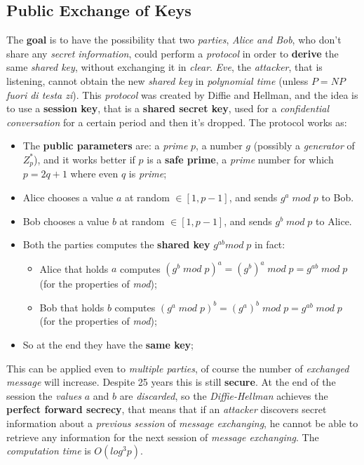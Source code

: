\documentclass{article}
\begin{document}
\subsection{Public Exchange of Keys}
The \textbf{goal} is to have the possibility that two \emph{parties}, \emph{Alice and Bob}, who don't share any \emph{secret information}, could perform a \emph{protocol} in order to \textbf{derive} the same \emph{shared key}, without exchanging it in \emph{clear}. \emph{Eve}, the \emph{attacker}, that is listening, cannot obtain the new \emph{shared key} in \emph{polynomial time} (unless $P=NP$ \emph{fuori di testa zi}). This \emph{protocol} was created by Diffie and Hellman, and the idea is to use a \textbf{session key}, that is a \textbf{shared secret key}, used for a \emph{confidential conversation} for a certain period and then it's dropped. The protocol works as:
\begin{itemize}
\item The \textbf{public parameters} are: a \emph{prime} $p$, a number $g$ (possibly a \emph{generator} of $Z_p^{*}$), and it works better if $p$ is a\textbf{ safe prime}, a \emph{prime} number for which $p=2q+1$ where even $q$ is \emph{prime};
\item Alice chooses a value $a$ at random $\in \left [1,p-1 \right]$, and sends $g^a\; mod\; p$ to Bob.
\item Bob chooses a value $b$ at random $\in \left [1,p-1 \right]$, and sends $g^b\; mod\; p$ to Alice.
\item Both the parties computes the \textbf{shared key} $g^{ab} mod\; p$ in fact:
\begin{itemize}
\item Alice that holds $a$ computes $(g^b\; mod\; p)^a = (g^b)^a\; mod\; p = g^{ab}\; mod\; p$ (for the properties of \emph{mod}); 
\item Bob that holds $b$ computes $(g^a\; mod\; p)^b = (g^a)^b\; mod\; p = g^{ab}\; mod\; p$ (for the properties of \emph{mod});
\end{itemize}
\item So at the end they have the \textbf{same key};
\end{itemize}
This can be applied even to \emph{multiple parties}, of course the number of \emph{exchanged message} will increase. Despite 25 years this is still \textbf{secure}. At the end of the session the \emph{values} $a$ and $b$ are \emph{discarded}, so the \emph{Diffie-Hellman} achieves the \textbf{perfect forward secrecy}, that means that if an \emph{attacker} discovers secret information about a \emph{previous session} of \emph{message exchanging}, he cannot be able to retrieve any information for the next session of \emph{message exchanging}. The \emph{computation time} is $O(log^3 p)$. \\\\
\end{document}
